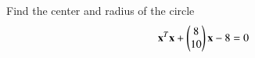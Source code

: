 \begin{flushleft}
Find the center and radius of the circle
\begin{align}
\mathbf{x}^T\mathbf{x} + \begin{pmatrix}8\\10\end{pmatrix}\mathbf{x} - 8 = 0
\end{align}
\end{flushleft}
